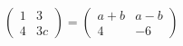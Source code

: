 \hspace*{2mm}\begin{minipage}[t]{\dimexpr\linewidth-2mm\relax}\vspace{0pt}
$\begin{pmatrix} 1 & 3 \\ 4 & 3c \end{pmatrix}=\begin{pmatrix} a+b & a-b \\ 4 & -6 \end{pmatrix}$\end{minipage}
